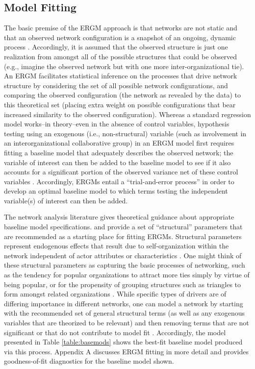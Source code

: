 \documentclass[12pt,a4paper,titlepage]{article}
\begin{document}
\subsection{Model Fitting}

The basic premise of the ERGM approach is that networks are not static and that an observed network configuration is a snapshot of an ongoing, dynamic process \parencite{lusher2013-a}. Accordingly, it is assumed that the observed structure is just one realization from amongst all of the possible structures that could be observed (e.g., imagine the observed network but with one more inter-organizational tie). An ERGM facilitates statistical inference on the processes that drive network structure by considering the set of all possible network configurations, and comparing the observed configuration (the network as revealed by the data) to this theoretical set (placing extra weight on possible configurations that bear increased similarity to the observed configuration). Whereas a standard regression model works--in theory--even in the absence of control variables, hypothesis testing using an exogenous (i.e., non-structural) variable (such as involvement in an interorganizational collaborative group) in an ERGM model first requires fitting a baseline model that adequately describes the observed network; the variable of interest can then be added to the baseline model to see if it also accounts for a significant portion of the observed variance net of these control variables \parencite{kolaczyk2009,lusher2013-a}. Accordingly, ERGMs entail a “trial-and-error process” \parencite[184]{lusher2013-a} in order to develop an optimal baseline model to which terms testing the independent variable(s) of interest can then be added.

The network analysis literature gives theoretical guidance about appropriate baseline model specifications. \textcite{snijders2006} and \textcite{lusher2013-a} provide a set of ``structural'' parameters that are recommended as a starting place for fitting ERGMs. Structural parameters represent endogenous effects that result due to self-organization within the network independent of actor attributes or characteristics \parencite{lusher2013-a}. One might think of these structural parameters as capturing the basic processes of networking, such as the tendency for popular organizations to attract more ties simply by virtue of being popular, or for the propensity of grouping structures such as triangles to form amongst related organizations \parencite{lusher2013-a}. While specific types of drivers are of differing importance in different networks, one can model a network by starting with the recommended set of general structural terms (as well as any exogenous variables that are theorized to be relevant) and then removing terms that are not significant or that do not contribute to model fit \parencite{snijders2006}. Accordingly, the model presented in Table \ref{table:basemods} shows the best-fit baseline model produced via this process. Appendix A discusses ERGM fitting in more detail and provides goodness-of-fit diagnostics for the baseline model shown. 
\end{document}
